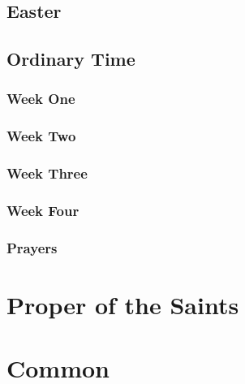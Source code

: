 \documentclass[12pt,twoside,a5paper]{memoir}
\begin{document}
\chapter*[Easter]{Easter}
\clearpage

%
\chapter*[Ordinary Time]{Ordinary Time}
\clearpage

\section*{Week One}
\section*{Week Two}
\section*{Week Three}
\section*{Week Four}
\section*{Prayers}
\part*{Proper of the Saints}
\part*{Common}
\end{document}
